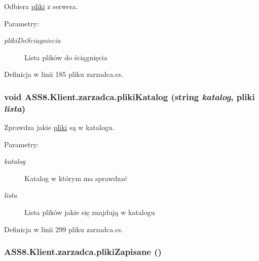 Odbiera \hyperlink{a00017}{pliki} z serwera. 

\begin{Desc}
\item[Parametry:]
\begin{description}
\item[{\em plikiDoSciagniecia}]Lista plików do ściągnięcia\end{description}
\end{Desc}


Definicja w linii 185 pliku zarzadca.cs.\hypertarget{a00037_0eb71b522a777a8dba01615aa58b2203}{
\subsubsection[{plikiKatalog}]{\setlength{\rightskip}{0pt plus 5cm}void ASS8.Klient.zarzadca.plikiKatalog (string {\em katalog}, \/  {\bf pliki} {\em lista})}}
\label{d1/dc6/a00037_0eb71b522a777a8dba01615aa58b2203}


Zprawdza jakie \hyperlink{a00017}{pliki} są w katalogu. 

\begin{Desc}
\item[Parametry:]
\begin{description}
\item[{\em katalog}]Katalog w którym ma sprawdzać\item[{\em lista}]Lista plików jakie się znajdują w katalogu\end{description}
\end{Desc}


Definicja w linii 299 pliku zarzadca.cs.\hypertarget{a00037_2806aca42bed01f5fefc1bda76b1f250}{
\subsubsection[{plikiZapisane}]{ ASS8.Klient.zarzadca.plikiZapisane ()}}
\label{d1/dc6/a00037_2806aca42bed01f5fefc1bda76b1f250}


